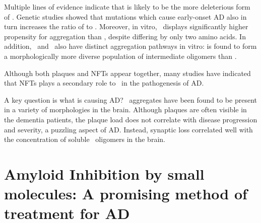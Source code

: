Multiple lines of evidence indicate that \abetafortytwo is likely to be the more deleterious form of \abeta. Genetic studies showed that mutations which cause early-onset AD also in turn increases the ratio of \abetafortytwo to \abetaforty.\cite{Hardy:1997tu} Moreover, in vitro, \abetafortytwo\ displays significantly higher propensity for aggregation than \abetaforty, despite differing by only two amino acids. In addition, \abetaforty\ and \abetafortytwo\ also have distinct aggregation pathways in vitro: \abetafortytwo is found to form a morphologically more diverse population of intermediate oligomers than \abetaforty.\cite{Bitan:2003ut} %

Although both plaques and NFTs appear together, many studies have indicated that NFTs plays a secondary role to \abeta\ in the pathogenesis of AD.\cite{XXX} %


A key question is what is causing AD? \abeta\ aggregates have been found to be present in a variety of morphologies in the brain. Although plaques are often visible in the dementia patients, the plaque load does not correlate with disease progression and severity, a puzzling aspect of AD.  Instead, synaptic loss correlated well with the concentration of soluble \abeta\ oligomers in the brain. %

\section{Amyloid Inhibition by small molecules: A promising method of treatment for AD}

